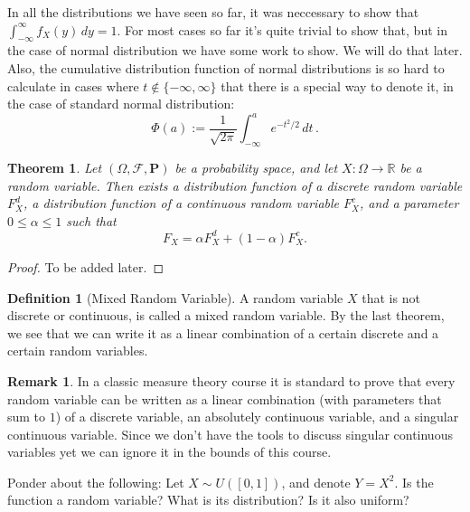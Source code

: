 \documentclass[11pt,a4paper]{article}
\theoremstyle{definition}
\newtheorem{definition}{Definition}[section]
\newtheorem{remark}{Remark}[section]
\theoremstyle{plain}
\newtheorem{theorem}{Theorem}[section]
\newcommand{\R}{\mathbb{R}}
\newcommand{\Prob}{\mathbf{P}}
\begin{document}
  In all the distributions we have seen so far, it was neccessary to show
  that $\int_{-\infty}^{\infty} f_X(y)\,dy = 1$. For most cases so far
  it's quite trivial to show that, but in the case of normal distribution
  we have some work to show. We will do that later. 
  Also, the cumulative distribution function of normal distributions is so
  hard to calculate in cases where $t \notin \{-\infty,\infty\}$ that
  there is a special way to denote it, in the case of standard normal
  distribution:
  \[
    \Phi (a) :=
    \frac{1}{\sqrt{2 \pi}}
    \int_{-\infty}^{a} e^{-t^{2}/2}\,dt\,.
  \]
  
  \begin{theorem}
    Let $(\Omega, \mathcal F, \Prob)$ be a probability space,
    and let $X \colon \Omega \to \R$ be a random variable.
    Then exists a distribution function of a discrete random variable
    $F_X^d$, a distribution function of a continuous random variable
    $F_X^c$, and a parameter $0 \le \alpha \le 1$ such that
    \[
      F_X = \alpha F_X^d + (1 - \alpha)F_X^c.
    \]
  \end{theorem}
  \begin{proof}
    To be added later.
  \end{proof}

  \begin{definition}[Mixed Random Variable]
    A random variable $X$ that is not discrete or continuous, is called
    a mixed random variable. By the last theorem, we see that we can
    write it as a linear combination of a certain discrete and
    a certain random variables.
  \end{definition}
  
  \begin{remark}
    In a classic measure theory course it is standard to prove that every
    random variable can be written as a linear combination (with parameters
    that sum to $1$) of a discrete variable, an absolutely continuous variable,
    and a singular continuous variable. Since we don't have the tools to
    discuss singular continuous variables yet we can ignore it in the bounds
    of this course.
  \end{remark}
  
  Ponder about the following: 
  Let $X \sim U([0,1])$, and denote $Y = X^2$. Is the function a random
  variable? What is its distribution? Is it also uniform?
\end{document}
